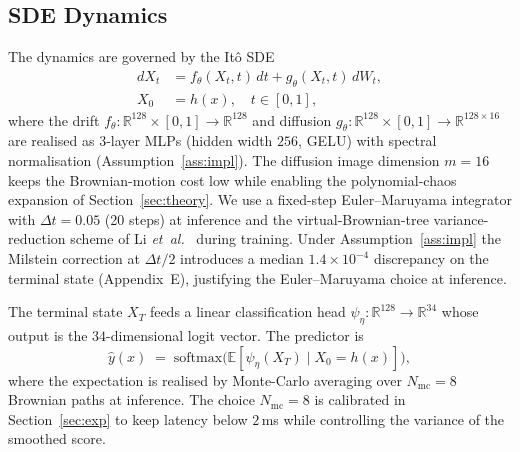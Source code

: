 \documentclass{ieeeaccess}
\newcommand{\Real}{\mathbb{R}}
\newcommand{\Exp}{\mathbb{E}}
\begin{document}
\subsection{SDE Dynamics}\label{subsec:sde}
The dynamics are governed by the It\^o SDE
\begin{equation}\label{eq:sde-train}
\begin{aligned}
  dX_t &= f_\theta(X_t,t)\,dt + g_\theta(X_t,t)\,dW_t,\\
  X_0  &= h(x),\quad t\in[0,1],
\end{aligned}
\end{equation}
where the drift $f_\theta:\Real^{128}\!\times\![0,1]\!\to\!\Real^{128}$
and diffusion $g_\theta:\Real^{128}\!\times\![0,1]\!\to\!\Real^{128\times 16}$
are realised as 3-layer MLPs (hidden width $256$, GELU) with spectral
normalisation (Assumption~\ref{ass:impl}). The diffusion image
dimension $m=16$ keeps the Brownian-motion cost low while enabling the
polynomial-chaos expansion of Section~\ref{sec:theory}. We use a
fixed-step Euler--Maruyama integrator with $\Delta t = 0.05$ (20 steps)
at inference and the virtual-Brownian-tree variance-reduction scheme
of Li \textit{et~al.}~\cite{li2020scalable} during training. Under
Assumption~\ref{ass:impl} the Milstein correction at $\Delta t/2$
introduces a median $1.4\times 10^{-4}$ discrepancy on the terminal
state (Appendix~E), justifying the Euler--Maruyama choice at inference.

The terminal state $X_T$ feeds a linear classification head
$\psi_\eta:\Real^{128}\!\to\!\Real^{34}$ whose output is the
$34$-dimensional logit vector. The predictor is
\begin{equation}\label{eq:predictor}
  \hat y(x) \;=\; \mathrm{softmax}\!\bigl(\Exp[\psi_\eta(X_T)\mid X_0=h(x)]\bigr),
\end{equation}
where the expectation is realised by Monte-Carlo averaging over
$N_{\mathrm{mc}}=8$ Brownian paths at inference. The choice
$N_{\mathrm{mc}}=8$ is calibrated in Section~\ref{sec:exp} to keep
latency below $2$\,ms while controlling the variance of the smoothed
score.
\end{document}
